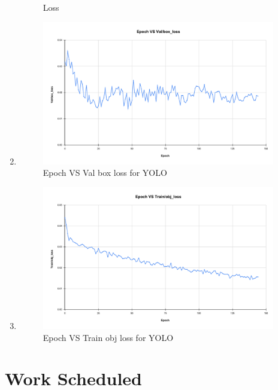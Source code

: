 \begin{enumerate}
\begin{figure}[H]
\begin{center}
	 \caption{Loss} %
	\label{figSample1} %
\end{center}
\end{figure}
\item 
\begin{figure}[H] %
\begin{center}
	\includegraphics[width = 4in]{images/Epoch VS Val_box_loss.pdf}
	 \caption{Epoch VS Val box loss for YOLO} %
	\label{figSample1} %
\end{center}
\end{figure}
\item 
\begin{figure}[H] %
\begin{center}
	\includegraphics[width = 4in]{images/Epoch VS Train_obj_loss.pdf}
	 \caption{Epoch VS Train obj loss for YOLO} %
	\label{figSample1} %
\end{center}
\end{figure}
\end{enumerate}


\section{Work Scheduled}

